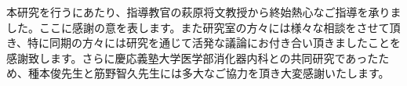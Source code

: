 本研究を行うにあたり、指導教官の萩原将文教授から終始熱心なご指導を承りました。ここに感謝の意を表します。また研究室の方々には様々な相談をさせて頂き、特に同期の方々には研究を通じて活発な議論にお付き合い頂きましたことを感謝致します。さらに慶応義塾大学医学部消化器内科との共同研究であったため、種本俊先生と筋野智久先生には多大なご協力を頂き大変感謝いたします。
